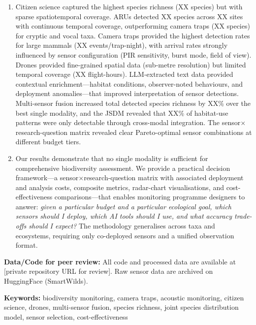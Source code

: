 \documentclass[12pt]{article}
\begin{document}
\begin{enumerate}
    \item %
    Citizen science captured the highest species richness (XX species) but with sparse spatiotemporal coverage. ARUs detected XX species across XX sites with continuous temporal coverage, outperforming camera traps (XX species) for cryptic and vocal taxa. Camera traps provided the highest detection rates for large mammals (XX events/trap-night), with arrival rates strongly influenced by sensor configuration (PIR sensitivity, burst mode, field of view). Drones provided fine-grained spatial data (sub-metre resolution) but limited temporal coverage (XX flight-hours). LLM-extracted text data provided contextual enrichment---habitat conditions, observer-noted behaviours, and deployment anomalies---that improved interpretation of sensor detections. Multi-sensor fusion increased total detected species richness by XX\% over the best single modality, and the JSDM revealed that XX\% of habitat-use patterns were only detectable through cross-modal integration. The sensor$\times$research-question matrix revealed clear Pareto-optimal sensor combinations at different budget tiers.

    \item Our results demonstrate that no single modality is sufficient for comprehensive biodiversity assessment. We provide a practical decision framework---a sensor$\times$research-question matrix with associated deployment and analysis costs, composite metrics, radar-chart visualisations, and cost-effectiveness comparisons---that enables monitoring programme designers to answer: \textit{given a particular budget and a particular ecological goal, which sensors should I deploy, which AI tools should I use, and what accuracy trade-offs should I expect?} The methodology generalises across taxa and ecosystems, requiring only co-deployed sensors and a unified observation format.
\end{enumerate}

\noindent\textbf{Data/Code for peer review:} All code and processed data are available at [private repository URL for review]. Raw sensor data are archived on HuggingFace (SmartWilds).

\noindent\textbf{Keywords:} biodiversity monitoring, camera traps, acoustic monitoring, citizen science, drones, multi-sensor fusion, species richness, joint species distribution model, sensor selection, cost-effectiveness

\newpage
\end{document}
